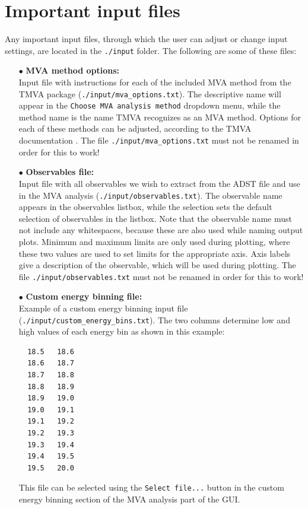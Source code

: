 \documentclass[12pt,a4paper]{report}
\begin{document}
\section{Important input files}
Any important input files, through which the user can adjust or change input settings, are located in the \texttt{./input} folder. The following are some of these files:
\begin{itemize}
\item[$\bullet$] \textbf{MVA method options:}\\Input file with instructions for each of the included MVA method from the TMVA package (\texttt{./input/mva\_options.txt}). The descriptive name will appear in the \texttt{Choose MVA analysis method} dropdown menu, while the method name is the name TMVA recognizes as an MVA method. Options for each of these methods can be adjusted, according to the TMVA documentation \cite{tmvadocument}. The file \texttt{./input/mva\_options.txt} must not be renamed in order for this to work!
\item[$\bullet$] \textbf{Observables file:}\\Input file with all observables we wish to extract from the ADST file and use in the MVA analysis (\texttt{./input/observables.txt}). The observable name appears in the observables listbox, while the selection sets the default selection of observables in the listbox. Note that the observable name must not include any whitespaces, because these are also used while naming output plots. Minimum and maximum limits are only used during plotting, where these two values are used to set limits for the appropriate axis. Axis labels give a description of the observable, which will be used during plotting. The file \texttt{./input/observables.txt} must not be renamed in order for this to work!
\item[$\bullet$] \textbf{Custom energy binning file:}\\Example of a custom energy binning input file \\(\texttt{./input/custom\_energy\_bins.txt}). The two columns determine low and high values of each energy bin as shown in this example:
{\footnotesize
\begin{verbatim}
  18.5   18.6
  18.6   18.7
  18.7   18.8
  18.8   18.9
  18.9   19.0
  19.0   19.1
  19.1   19.2
  19.2   19.3
  19.3   19.4
  19.4   19.5
  19.5   20.0
\end{verbatim}
}
This file can be selected using the \texttt{Select file...} button in the custom energy binning section of the MVA analysis part of the GUI.

\end{itemize}
\end{document}
